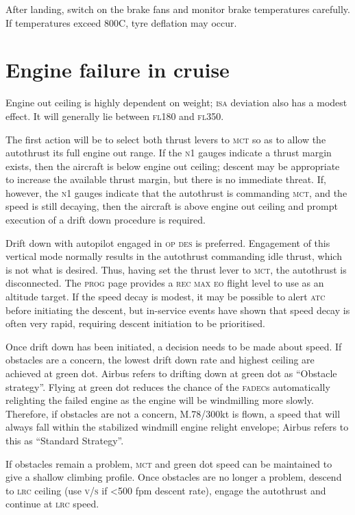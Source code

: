 \documentclass[a5paper,11pt,twoside]{book}
\newcommand{\ac}[1]{{\scshape\MakeLowercase{#1}}}
\newcommand{\inlcite}[1]{{\ac{#1}}}
\newcommand{\multicite}[1]{%
  \nopagebreak
  \noindent{{\color{blue}\footnotesize[ \inlcite{#1} ]}}
}
\begin{document}
After landing, switch on the brake fans and monitor brake temperatures
carefully. If temperatures exceed 800\textdegree C, tyre deflation may occur.

\multicite{QRH~AER.MISC, FCOM~PRO.AER.MISC, FCTM~PRO.AER.MISC}

\section{Engine failure in cruise}

Engine out ceiling is highly dependent on weight; \ac{ISA} deviation also has a
modest effect. It will generally lie between \ac{FL}180 and \ac{FL}350.

The first action will be to select both thrust levers to \ac{MCT} so as to allow
the autothrust its full engine out range. If the \ac{N}1 gauges indicate a
thrust margin exists, then the aircraft is below engine out ceiling; descent may
be appropriate to increase the available thrust margin, but there is no
immediate threat. If, however, the \ac{N}1 gauges indicate that the autothrust
is commanding \ac{MCT}, and the speed is still decaying, then the aircraft is
above engine out ceiling and prompt execution of a drift down procedure is
required.

Drift down with autopilot engaged in \ac{OP} \ac{DES} is preferred. Engagement
of this vertical mode normally results in the autothrust commanding idle thrust,
which is not what is desired. Thus, having set the thrust lever to \ac{MCT}, the
autothrust is disconnected. The \ac{PROG} page provides a \ac{REC MAX EO} flight
level to use as an altitude target. If the speed decay is modest, it may be
possible to alert \ac{ATC} before initiating the descent, but in-service events
have shown that speed decay is often very rapid, requiring descent initiation to
be prioritised.

Once drift down has been initiated, a decision needs to be made about speed. If
obstacles are a concern, the lowest drift down rate and highest ceiling are
achieved at green dot. Airbus refers to drifting down at green dot as ``Obstacle
strategy''. Flying at green dot reduces the chance of the \ac{FADEC}s
automatically relighting the failed engine as the engine will be windmilling
more slowly. Therefore, if obstacles are not a concern, M.78/300kt is flown, a
speed that will always fall within the stabilized windmill engine relight
envelope; Airbus refers to this as ``Standard Strategy''.

If obstacles remain a problem, \ac{MCT} and green dot speed can be maintained to
give a shallow climbing profile. Once obstacles are no longer a problem, descend
to \ac{LRC} ceiling (use \ac{V/S} if <500 fpm descent rate), engage the autothrust
and continue at \ac{LRC} speed.
\end{document}
